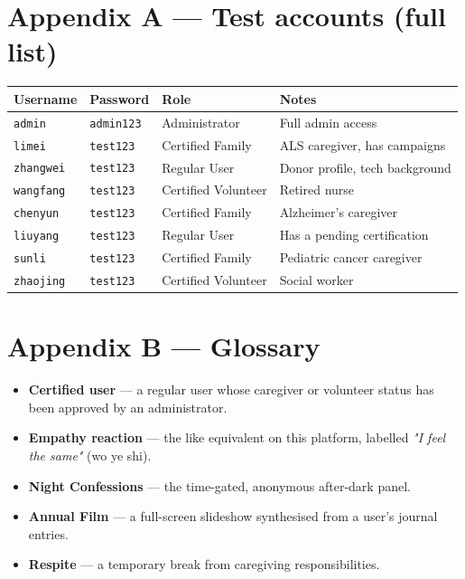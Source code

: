 \section*{Appendix A — Test accounts (full list)}
{\small
\begin{tabularx}{\linewidth}{@{} l l L{4cm} X @{}}
  \toprule
  \textbf{Username} & \textbf{Password} & \textbf{Role} & \textbf{Notes} \\
  \midrule
  \texttt{admin}     & \texttt{admin123} & Administrator       & Full admin access \\
  \texttt{limei}     & \texttt{test123}  & Certified Family    & ALS caregiver, has campaigns \\
  \texttt{zhangwei}  & \texttt{test123}  & Regular User        & Donor profile, tech background \\
  \texttt{wangfang}  & \texttt{test123}  & Certified Volunteer & Retired nurse \\
  \texttt{chenyun}   & \texttt{test123}  & Certified Family    & Alzheimer's caregiver \\
  \texttt{liuyang}   & \texttt{test123}  & Regular User        & Has a pending certification \\
  \texttt{sunli}     & \texttt{test123}  & Certified Family    & Pediatric cancer caregiver \\
  \texttt{zhaojing}  & \texttt{test123}  & Certified Volunteer & Social worker \\
  \bottomrule
\end{tabularx}}

\section*{Appendix B — Glossary}
\begin{itemize}
  \item \textbf{Certified user} — a regular user whose caregiver or
        volunteer status has been approved by an administrator.
  \item \textbf{Empathy reaction} — the like equivalent on this
        platform, labelled \emph{"I feel the same"} (wo ye shi).
  \item \textbf{Night Confessions} — the time-gated, anonymous
        after-dark panel.
  \item \textbf{Annual Film} — a full-screen slideshow synthesised from
        a user's journal entries.
  \item \textbf{Respite} — a temporary break from caregiving
        responsibilities.
\end{itemize}



